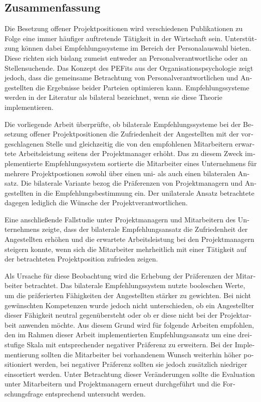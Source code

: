 \begin{otherlanguage}{ngerman}
\chapter*{Zusammenfassung}
Die Besetzung offener Projektpositionen wird verschiedenen Publikationen zu Folge eine immer häufiger auftretende Tätigkeit in der Wirtschaft sein. Unterstützung können dabei Empfehlungssysteme im Bereich der Personalauswahl bieten. Diese richten sich bislang zumeist entweder an Personalverantwortliche oder an Stellensuchende. Das Konzept des \aclp{PEFit} aus der Organisationspsychologie zeigt jedoch, dass die gemeinsame Betrachtung von Personalverantwortlichen und Angestellten die Ergebnisse beider Parteien optimieren kann. Empfehlungssysteme werden in der Literatur als bilateral bezeichnet, wenn sie diese Theorie implementieren.

Die vorliegende Arbeit überprüfte, ob bilaterale Empfehlungssysteme bei der Besetzung offener Projektpositionen die Zufriedenheit der Angestellten mit der vorgeschlagenen Stelle und gleichzeitig die von den empfohlenen Mitarbeitern erwartete Arbeitsleistung seitens der Projektmanager erhöht. Das zu diesem Zweck implementierte Empfehlungssystem sortierte die Mitarbeiter eines Unternehmens für mehrere Projektpostionen sowohl über einen uni- als auch einen bilateralen Ansatz. Die bilaterale Variante bezog die Präferenzen von Projektmanagern und Angestellten in die Empfehlungsbestimmung ein. Der unilaterale Ansatz betrachtete dagegen lediglich die Wünsche der Projektverantwortlichen.

Eine anschließende Fallstudie unter Projektmanagern und Mitarbeitern des Unternehmens zeigte, dass der bilaterale Empfehlungsansatz die Zufriedenheit der Angestellten erhöhen und die erwartete Arbeitsleistung bei den Projektmanagern steigern konnte, wenn sich die Mitarbeiter mehrheitlich mit einer Tätigkeit auf der betrachteten Projektposition zufrieden zeigen.

Als Ursache für diese Beobachtung wird die Erhebung der Präferenzen der Mitarbeiter betrachtet. Das bilaterale Empfehlungssystem nutzte booleschen Werte, um die präferierten Fähigkeiten der Angestellten stärker zu gewichten. Bei nicht gewünschten Kompetenzen wurde jedoch nicht unterschieden, ob ein Angestellter dieser Fähigkeit neutral gegenübersteht oder ob er diese nicht bei der Projektarbeit anwenden möchte. Aus diesem Grund wird für folgende Arbeiten empfohlen, den im Rahmen dieser Arbeit implementierten Empfehlungsansatz um eine dreistufige Skala mit entsprechender negativer Präferenz zu erweitern. Bei der Implementierung sollten die Mitarbeiter bei vorhandenem Wunsch weiterhin höher positioniert werden, bei negativer Präferenz sollten sie jedoch zusätzlich niedriger einsortiert werden. Unter Betrachtung dieser Veränderungen sollte die Evaluation unter Mitarbeitern und Projektmanagern erneut durchgeführt und die Forschungsfrage entsprechend untersucht werden.
\end{otherlanguage}

